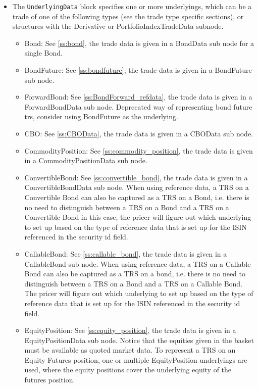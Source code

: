 \begin{itemize}
\item The {\tt UnderlyingData} block specifies one or more underlyings, which can be a trade of one of the following
  types (see the trade type specific sections), or structures with the Derivative or PortfolioIndexTradeData subnode. 
  \begin{itemize}
  \item Bond: See \ref{ss:bond}, the trade data is given in a BondData sub node for a single Bond.
  \item BondFuture: See \ref{ss:bondfuture}, the trade data is given in a BondFuture sub node.
  \item ForwardBond: See \ref{ss:BondForward_refdata}, the trade data is given in a ForwardBondData sub node. Deprecated way of representing bond future trs, consider using BondFuture as the underlying.
  \item CBO: See \ref{ss:CBOData}, the trade data is given in a CBOData sub node.
  \item CommodityPosition: See \ref{ss:commodity_position}, the trade data is given in a CommodityPositionData sub node.
  \item ConvertibleBond: See \ref{ss:convertible_bond}, the trade data is given in a ConvertibleBondData sub
    node. When using reference data, a TRS on a Convertible Bond can also be captured as a TRS on a Bond, i.e. there is
    no need to distinguish between a TRS on a Bond and a TRS on a Convertible Bond in this case, the pricer will figure
    out which underlying to set up based on the type of reference data that is set up for the ISIN referenced in the
    security id field.
  \item CallableBond: See \ref{ss:callable_bond}, the trade data is given in a CallableBond sub node. When using reference data, 
  a TRS on a Callable Bond can also be captured as a TRS on a bond, i.e. there is no need to distinguish between a TRS on a Bond and a TRS on a Callable Bond.  
  The pricer will figure out which underlying to set up based on the type of reference data that is set up for the ISIN referenced in the security id field.   
  \item EquityPosition: See \ref{ss:equity_position}, the trade data is given in a EquityPositionData sub
    node. Notice that the equities given in the basket must be available as quoted market data. To represent a TRS on an Equity Futures position, one or multiple EquityPosition underlyings are used, where the equity positions cover the underlying equity of the futures position.


\end{itemize}
\end{itemize}
